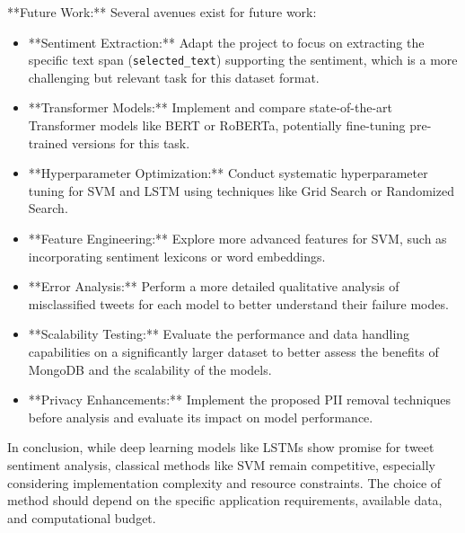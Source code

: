 \documentclass[10pt,twocolumn]{article}
\begin{document}
**Future Work:** Several avenues exist for future work:
\begin{itemize}[itemsep=0pt, topsep=3pt]
    \item **Sentiment Extraction:** Adapt the project to focus on extracting the specific text span (\texttt{selected\_text}) supporting the sentiment, which is a more challenging but relevant task for this dataset format. %
    \item **Transformer Models:** Implement and compare state-of-the-art Transformer models like BERT or RoBERTa, potentially fine-tuning pre-trained versions for this task.
    \item **Hyperparameter Optimization:** Conduct systematic hyperparameter tuning for SVM and LSTM using techniques like Grid Search or Randomized Search.
    \item **Feature Engineering:** Explore more advanced features for SVM, such as incorporating sentiment lexicons or word embeddings.
    \item **Error Analysis:** Perform a more detailed qualitative analysis of misclassified tweets for each model to better understand their failure modes.
    \item **Scalability Testing:** Evaluate the performance and data handling capabilities on a significantly larger dataset to better assess the benefits of MongoDB and the scalability of the models.
    \item **Privacy Enhancements:** Implement the proposed PII removal techniques before analysis and evaluate its impact on model performance.
\end{itemize}

In conclusion, while deep learning models like LSTMs show promise for tweet sentiment analysis, classical methods like SVM remain competitive, especially considering implementation complexity and resource constraints. The choice of method should depend on the specific application requirements, available data, and computational budget.

\end{document}
